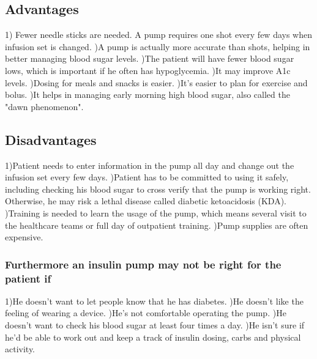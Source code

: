 \documentclass[12pt]{article}
\begin{document}
\begin{normalsize}
\subsection{Advantages}
1) Fewer needle sticks are needed. A pump requires one shot every few days when infusion set is changed.
)A pump is actually more accurate than shots, helping in better managing blood sugar levels.
)The patient will have fewer blood sugar lows, which is important if he often has hypoglycemia.
)It may improve A1c levels.
)Dosing for meals and snacks is easier.
)It's easier to plan for exercise and bolus.
)It helps in managing early morning high blood sugar, also called the "dawn phenomenon".
\subsection{Disadvantages}
1)Patient needs to enter information in the pump all day and change out the infusion set every few days.
)Patient has to be committed to using it safely, including checking his blood sugar to cross verify that the pump is working right. Otherwise, he may risk a lethal disease called diabetic ketoacidosis (KDA).
)Training is needed to learn the usage of the pump, which means several visit to the healthcare teams or full day of outpatient training.
)Pump supplies are often expensive.

\subsubsection{Furthermore an insulin pump may not be right for the patient if}
1)He doesn't want to let people know that he has diabetes.
)He doesn't like the feeling of wearing a device.
)He's not comfortable operating the pump.
)He doesn't want to check his blood sugar at least four times a day.
)He isn't sure if he'd be able to work out and keep a track of insulin dosing, carbs and physical activity.
\clearpage


\end{normalsize}
\end{document}
